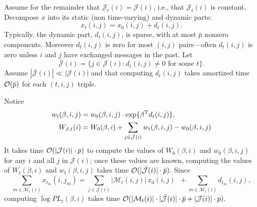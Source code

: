 \documentclass[aoas,preprint]{imsart}
\begin{document}
Assume for the remainder that
$\mathcal{J}_t(i) = \mathcal{J}(i)$, i.e., that $\mathcal{J}_t(i)$ is
constant.  Decompose $x$ into its static (non time-varying) and dynamic parts:
\[
    x_t(i,j)
        = x_0(i,j) + d_t(i,j).
\]
Typically, the dynamic part, $d_t(i,j)$, is sparse, with at most $\bar p$
nonzero components.  Moreover $d_t(i,j)$ is zero for most $(i,j)$
pairs---often $d_t(i,j)$ is zero unless $i$ and $j$ have exchanged
messages in the past.  Let
\[
    \mathcal{\bar J}(i)
        =
        \{
            j \in \mathcal{J}(i) : d_t(i,j) \neq 0 
            \,\,
            \text{for some $t$}
        \}.
\]
Assume $|\mathcal{\bar J}(i)| \ll |\mathcal{J}(i)|$ and that 
computing $d_t(i,j)$ takes amortized time $\mathcal{O}(\bar p)$ for each
$(t,i,j)$ triple.

Notice
\begin{align*}
    w_{t}(\beta,i,j)
        &=
            w_{0}(\beta,i,j)
            \cdot
            \exp\{ \beta^\trans d_t(i,j) \}, \\
    W_{\beta,t}(i)
        &=
            W_{0}(\beta,i)
            +
            \sum_{j \in \mathcal{\bar J}(i)}
                w_{t}(\beta,i,j) - w_{0}(\beta,i,j)
\end{align*}
It takes time $\mathcal{O}(|\mathcal{J}(i)| \cdot p)$ to compute the values of
$W_{0}(\beta,i)$ and $w_{0}(\beta,i,j)$ for any $i$ and all
$j$ in $\mathcal{J}(i)$; once these values are known, computing the values
of $W_{t}(\beta,i)$ and $w_{t}(\beta,i,j)$ takes time
\(
    \mathcal{O}(|\mathcal{\bar J}(i)| \cdot \bar p).
\)
Since
\[
    \sum_{m\in \mathcal{M}_t(i)}
        x_{t_m}\!(i,j_m)
        =
            \sum_{j \in \mathcal{J}(i)}
                |\mathcal{M}_t(i,j)| \, x_0(i,j)
            \,\,\,
            +
            \sum_{m \in \mathcal{M}_t(i)}
                d_{t_m}\!(i,j),
\]
computing $\log \mathit{PL}_t(\beta, i)$ takes time
\(
    \mathcal{O}(
        |\mathcal{M}_t(i)| \cdot |\mathcal{\bar J}(i)| \cdot \bar p
        +
        |\mathcal{J}(i)| \cdot p
    ).
\)
\end{document}
